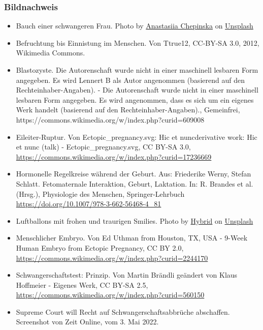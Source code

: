 \documentclass{beamer}
\begin{document}
\begin{frame}
\frametitle{Bildnachweis}

\begin{tiny}
 
\begin{itemize}


\item
Bauch einer schwangeren Frau. Photo by \href{https://unsplash.com/es/@anastasiiachepinska?utm_source=unsplash&utm_medium=referral&utm_content=creditCopyText}{Anastasiia Chepinska} on \href{https://unsplash.com/s/photos/pregnancy?utm_source=unsplash&utm_medium=referral&utm_content=creditCopyText}{Unsplash}


\item
Befruchtung bis Einnistung im Menschen. Von Ttrue12, CC-BY-SA 3.0, 2012, Wikimedia Commons. 

\item
Blastozyste. Die Autorenschaft wurde nicht in einer maschinell lesbaren Form angegeben. Es wird Lennert B als Autor angenommen (basierend auf den Rechteinhaber-Angaben). - Die Autorenschaft wurde nicht in einer maschinell lesbaren Form angegeben. Es wird angenommen, dass es sich um ein eigenes Werk handelt (basierend auf den Rechteinhaber-Angaben)., Gemeinfrei, https://commons.wikimedia.org/w/index.php?curid=609008

\item
Eileiter-Ruptur. Von Ectopic\_pregnancy.svg: Hic et nuncderivative work: Hic et nunc (talk) - Ectopic\_pregnancy.svg, CC BY-SA 3.0, \url{https://commons.wikimedia.org/w/index.php?curid=17236669}

\item
Hormonelle Regelkreise während der Geburt. Aus: Friederike Werny, Stefan Schlatt. Fetomaternale Interaktion, Geburt, Laktation. In: R. Brandes et al. (Hrsg.), Physiologie des Menschen, Springer-Lehrbuch \url{https://doi.org/10.1007/978-3-662-56468-4_81}


\item
Luftballons mit frohen und traurigen Smilies. Photo by \href{https://unsplash.com/@artbyhybrid?utm_source=unsplash&utm_medium=referral&utm_content=creditCopyText}{Hybrid} on \href{https://unsplash.com/s/photos/feedback?utm_source=unsplash&utm_medium=referral&utm_content=creditCopyText}{Unsplash}


\item
Menschlicher Embryo. Von Ed Uthman from Houston, TX, USA - 9-Week Human Embryo from Ectopic Pregnancy, CC BY 2.0, \url{https://commons.wikimedia.org/w/index.php?curid=2244170}

\item
Schwangerschaftstest: Prinzip. Von Martin Brändli geändert von Klaus Hoffmeier - Eigenes Werk, CC BY-SA 2.5, \url{https://commons.wikimedia.org/w/index.php?curid=560150}




\item
Supreme Court will Recht auf Schwangerschaftsabbrüche abschaffen. Screenshot von Zeit Online, vom 3. Mai 2022.
\end{itemize}
\end{tiny}
\end{frame}
\end{document}
